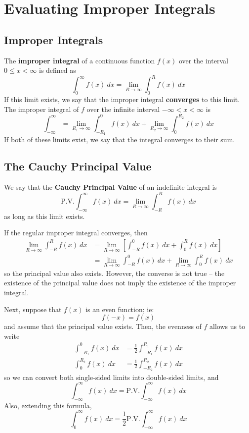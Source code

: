 \documentclass{article}
\renewcommand{\emph}{\textbf}
\begin{document}
\section{Evaluating Improper Integrals}
\subsection{Improper Integrals}
The \emph{improper integral} of a continuous function $f(x)$ over the interval $0 \le x < \infty$ is defined as
\[
	\int_0^\infty f(x)~dx = \lim_{R \to \infty} \int_0^R f(x)~dx
\]
If this limit exists, we say that the improper integral \emph{converges} to this limit. The improper integral of $f$ over the infinite interval $-\infty < x < \infty$ is
\[
	\int_{-\infty}^\infty 
	= \lim_{R_1 \to \infty} \int_{-R_1}^0 f(x)~dx
	+ \lim_{R_2 \to \infty} \int_0^{R_2}  f(x)~dx
\]
If both of these limits exist, we say that the integral converges to their sum.

\subsection{The Cauchy Principal Value}
We say that the \emph{Cauchy Principal Value} of an indefinite integral is
\[
	\text{P.V.} \int_{-\infty}^\infty f(x)~dx
	= \lim_{R \to \infty} \int_{-R}^R f(x)~dx
\]
as long as this limit exists. 

If the regular improper integral converges, then
\begin{align*}
	\lim_{R \to \infty} \int_{-R}^R f(x)~dx 
	&= \lim_{R \to \infty} \left[ \int_{-R}^0 f(x)~dx + \int_0^R f(x)~dx \right] \\
	&= \lim_{R \to \infty} \int_{-R}^0 f(x)~dx + \lim_{R \to \infty} \int_0^R f(x)~dx
\end{align*}
so the principal value also exists. However, the converse is not true -- the existence of the principal value does not imply the existence of the improper integral.

Next, suppose that $f(x)$ is an even function; ie:
\[
	f(-x) = f(x)
\]
and assume that the principal value exists. Then, the evenness of $f$ allows us to write
\begin{align*}
	\int_{-R_1}^0 f(x)~dx &= \frac{1}{2} \int_{-R_1}^{R_1} f(x)~dx \\
	\int_0^{R_2}  f(x)~dx &= \frac{1}{2} \int_{-R_2}^{R_2} f(x)~dx
\end{align*}
so we can convert both single-sided limits into double-sided limits, and
\[
	\int_{-\infty}^\infty f(x)~dx = \text{P.V.} \int_{-\infty}^\infty f(x)~dx
\]
Also, extending this formula,
\[
	\int_0^\infty f(x)~dx = \frac{1}{2} \text{P.V.} \int_{-\infty}^\infty f(x)~dx
\]
\end{document}
